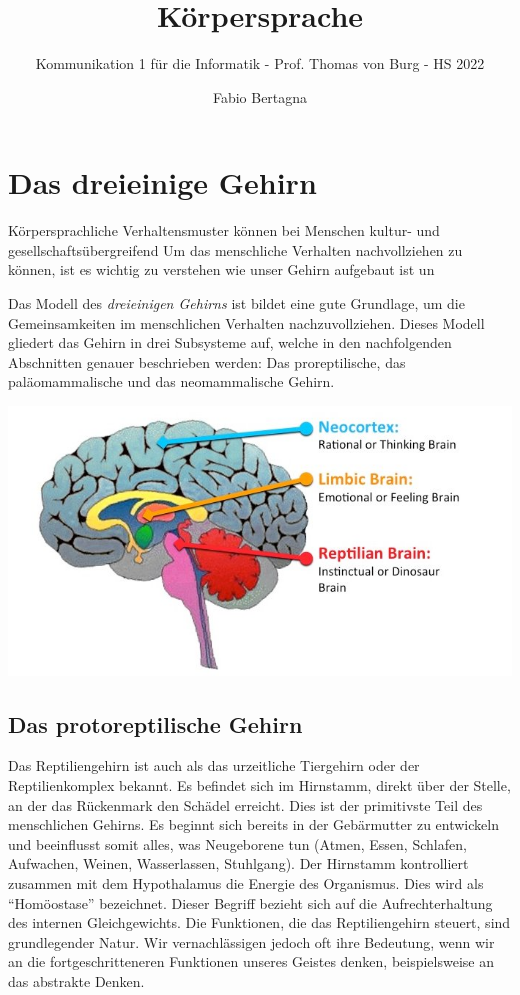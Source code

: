 \documentclass[
    invert-title=false,
    titlepage=true,
    titleimage-ratio=1011,
    parskip=half-,
]{bfhpub}                %
\title{Körpersprache}
\subtitle{Kommunikation 1 für die Informatik - Prof. Thomas von Burg - HS 2022}
\author{Fabio Bertagna}
\institute{Kommunikation 1 für die Informatik}
\begin{document}
    \maketitle
    \tableofcontents

    
    

    \section{Das dreieinige Gehirn}\label{sec:das-dreieinige-gehirn}
    Körpersprachliche Verhaltensmuster können bei Menschen kultur- und gesellschaftsübergreifend
    Um das menschliche Verhalten nachvollziehen zu können, ist es wichtig zu verstehen wie unser Gehirn aufgebaut ist un

    Das Modell des \textit{dreieinigen Gehirns} ist bildet eine gute Grundlage, um die Gemeinsamkeiten im menschlichen Verhalten nachzuvollziehen.
    Dieses Modell gliedert das Gehirn in drei Subsysteme auf, welche in den nachfolgenden Abschnitten genauer beschrieben werden:
    Das proreptilische, das paläomammalische und das neomammalische Gehirn.

    \includegraphics[width=\textwidth]{images/brain}

    \subsection{Das protoreptilische Gehirn}
    Das Reptiliengehirn ist auch als das urzeitliche Tiergehirn oder der Reptilienkomplex bekannt.
    Es befindet sich im Hirnstamm, direkt über der Stelle, an der das Rückenmark den Schädel erreicht.
    Dies ist der primitivste Teil des menschlichen Gehirns.
    Es beginnt sich bereits in der Gebärmutter zu entwickeln und beeinflusst somit alles, was Neugeborene tun (Atmen, Essen, Schlafen, Aufwachen, Weinen, Wasserlassen, Stuhlgang).
    Der Hirnstamm kontrolliert zusammen mit dem Hypothalamus die Energie des Organismus.
    Dies wird als “Homöostase” bezeichnet.
    Dieser Begriff bezieht sich auf die Aufrechterhaltung des internen Gleichgewichts.
    Die Funktionen, die das Reptiliengehirn steuert, sind grundlegender Natur.
    Wir vernachlässigen jedoch oft ihre Bedeutung, wenn wir an die fortgeschritteneren Funktionen unseres Geistes denken, beispielsweise an das abstrakte Denken.
\end{document}
